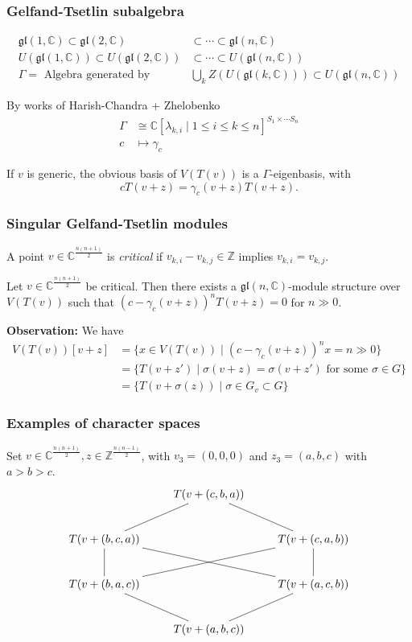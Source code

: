 \documentclass[smaller,usepdftitle=false]{beamer}
\newcommand\CC{\mathbb C}
\newcommand\ZZ{\mathbb Z}
\newcommand\gl{\mathfrak{gl}}
\begin{document}
\begin{frame}
\frametitle{Gelfand-Tsetlin subalgebra}

\begin{align*}
\gl(1,\CC) 
	\subset \gl(2,\CC) &\subset \cdots \subset \gl(n,\CC) \\
U(\gl(1,\CC)) 
	\subset U(\gl(2,\CC)) &\subset \cdots \subset U(\gl(n,\CC)) \\
\Gamma 
	= \mbox{ Algebra generated by } &\bigcup_k Z(U(\gl(k,\CC))) 
\subset U(\gl(n,\CC))
\end{align*}

By works of Harish-Chandra + Zhelobenko
\begin{align*}
\Gamma 
	&\cong \CC[\lambda_{k,i} \mid 1 \leq i \leq k 
		\leq n]^{S_1 \times \cdots S_n} \\
c &\longmapsto \gamma_c
\end{align*}

\pause

\begin{Theorem}
If $v$ is generic, the obvious basis of $V(T(v))$ is a $\Gamma$-eigenbasis, 
with $$c T(v+z) = \gamma_c(v+z) T(v+z).$$
\end{Theorem}
\end{frame}

\begin{frame}
\frametitle{Singular Gelfand-Tsetlin modules}
A point $v \in \CC^{\frac{n(n+1)}{2}}$ is \emph{critical} if $v_{k,i} - 
v_{k,j} \in \ZZ$ implies $v_{k,i} = v_{k,j}$.

\begin{Theorem}[Ramírez, Z. -- 2017]
Let $v \in \CC^{\frac{n(n+1)}{2}}$ be critical. Then there exists a 
$\gl(n,\CC)$-module structure over $V(T(v))$ such that $(c - \gamma_c(v+z))^n 
T(v+z) = 0$ for $n \gg 0$.
\end{Theorem}

\textbf{Observation:} We have 
\begin{align*}
V(T(v))[v+z] 
	&= \{x \in V(T(v)) \mid (c - \gamma_{c}(v+z))^n x = n \gg 0\} \\
	&=\{T(v+z') \mid \sigma(v+z) = \sigma(v+z') 
		\mbox{ for some } \sigma \in G\} \\
	& = \{T(v+\sigma(z)) \mid \sigma \in G_v \subset G\} 
\end{align*}

\end{frame}

\begin{frame}
\frametitle{Examples of character spaces}
Set $v \in \CC^{\frac{n(n+1)}{2}}, z \in \ZZ^{\frac{n(n-1)}{2}}$, with $v_3 = 
(0,0,0)$ and $z_3 = (a,b,c)$ with $a > b > c$.
\begin{align*}
\xymatrix{
& T(v+(c,b,a)) & \\
	T(v+(b,c,a)) \ar@{-}[ur]& & T(v+(c,a,b)) \ar@{-}[ul]\\
	T(v+(b,a,c)) \ar@{-}[u] \ar@{-}[urr] &  & T(v+(a,c,b)) \ar@{-}[u] 
		\ar@{-}[ull]\\
	& T(v+(a,b,c)) \ar@{-}[ur] \ar@{-}[ul] & 
}
\end{align*}
\end{frame}
\end{document}
